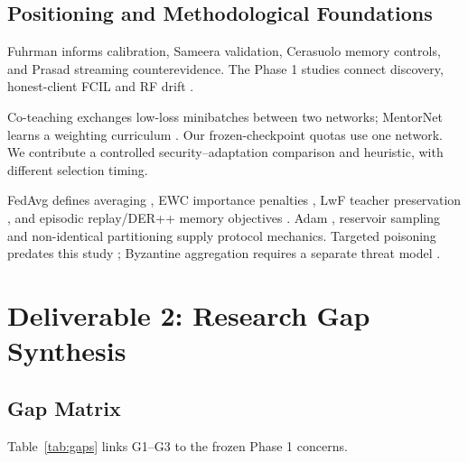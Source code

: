 \documentclass[10pt,a4paper]{article}
\begin{document}
\subsection{Positioning and Methodological Foundations}
Fuhrman informs calibration, Sameera validation, Cerasuolo memory controls, and Prasad streaming counterevidence. The Phase 1 studies connect discovery, honest-client FCIL and RF drift \cite{ge,wu,luo}.

Co-teaching exchanges low-loss minibatches between two networks; MentorNet learns a weighting curriculum \cite{coteach,mentornet}. Our frozen-checkpoint quotas use one network. We contribute a controlled security--adaptation comparison and heuristic, with different selection timing.

FedAvg defines averaging \cite{fedavg}, EWC importance penalties \cite{ewc}, LwF teacher preservation \cite{lwf}, and episodic replay/DER++ memory objectives \cite{tiny,der}. Adam \cite{adam}, reservoir sampling \cite{vitter} and non-identical partitioning \cite{hsu} supply protocol mechanics. Targeted poisoning predates this study \cite{tolpegin}; Byzantine aggregation requires a separate threat model \cite{krum,yin}.

\section{Deliverable 2: Research Gap Synthesis}
\subsection{Gap Matrix}
Table~\ref{tab:gaps} links G1--G3 to the frozen Phase 1 concerns.
\end{document}
